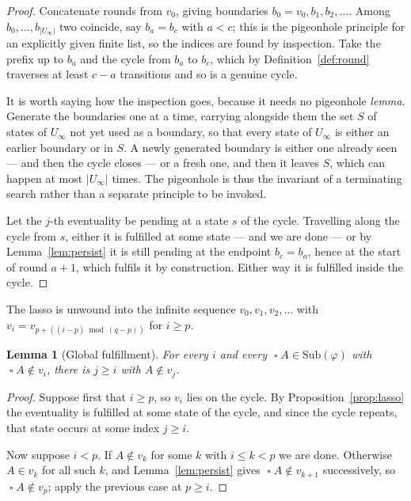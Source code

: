 \documentclass[11pt,a4paper]{article}
\newtheorem{lemma}[theorem]{Lemma}
\theoremstyle{definition}
\newcommand{\Always}{\mathop{\square}}
\newcommand{\Sub}{\mathrm{Sub}}
\begin{document}
\begin{proof}
Concatenate rounds from $v_0$, giving boundaries $b_0=v_0,b_1,b_2,\dots$.  Among
$b_0,\dots,b_{|U_\infty|}$ two coincide, say $b_a=b_c$ with $a<c$; this is the
pigeonhole principle for an explicitly given finite list, so the indices are
found by inspection.  Take the prefix up to $b_a$ and the cycle from $b_a$ to
$b_c$, which by Definition~\ref{def:round} traverses at least $c-a$
transitions and so is a genuine cycle.

It is worth saying how the inspection goes, because it needs no pigeonhole
\emph{lemma}.  Generate the boundaries one at a time, carrying alongside them
the set $S$ of states of $U_\infty$ not yet used as a boundary, so that every
state of $U_\infty$ is either an earlier boundary or in $S$.  A newly generated
boundary is either one already seen --- and then the cycle closes --- or a fresh
one, and then it leaves $S$, which can happen at most $|U_\infty|$ times.  The
pigeonhole is thus the invariant of a terminating search rather than a separate
principle to be invoked.

Let the $j$-th eventuality be pending at a state $s$ of the cycle.  Travelling
along the cycle from $s$, either it is fulfilled at some state --- and we are
done --- or by Lemma~\ref{lem:persist} it is still pending at the endpoint
$b_c=b_a$, hence at the start of round $a{+}1$, which fulfils it by
construction.  Either way it is fulfilled inside the cycle.
\end{proof}

The lasso is unwound into the infinite sequence $v_0,v_1,v_2,\dots$ with
$v_{i}=v_{p+((i-p)\bmod(q-p))}$ for $i\ge p$.

\begin{lemma}[Global fulfillment]\label{lem:global}
For every $i$ and every $\Always A\in\Sub(\varphi)$ with $\Always A\notin v_i$,
there is $j\ge i$ with $A\notin v_j$.
\end{lemma}

\begin{proof}
Suppose first that $i\ge p$, so $v_i$ lies on the cycle.  By
Proposition~\ref{prop:lasso} the eventuality is fulfilled at some state of the
cycle, and since the cycle repeats, that state occurs at some index $j\ge i$.

Now suppose $i<p$.  If $A\notin v_k$ for some $k$ with $i\le k<p$ we are done.
Otherwise $A\in v_k$ for all such $k$, and Lemma~\ref{lem:persist} gives
$\Always A\notin v_{k+1}$ successively, so $\Always A\notin v_p$; apply the
previous case at $p\ge i$.
\end{proof}
\end{document}
